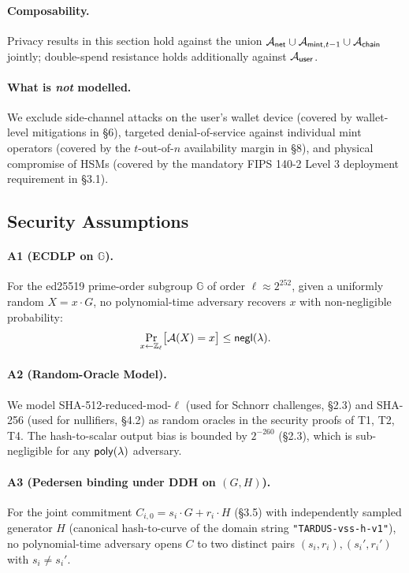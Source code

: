 \paragraph{Composability.} Privacy results in this section hold against the
union $\mathcal{A}_{\mathsf{net}} \cup \mathcal{A}_{\mathsf{mint},t-1} \cup
\mathcal{A}_{\mathsf{chain}}$ jointly; double-spend resistance holds additionally
against $\mathcal{A}_{\mathsf{user}}$.

\paragraph{What is \emph{not} modelled.} We exclude side-channel attacks on
the user's wallet device (covered by wallet-level mitigations in
\S6), targeted denial-of-service against individual mint
operators (covered by the $t$-out-of-$n$ availability margin in
\S8), and physical compromise of HSMs (covered by the
mandatory FIPS 140-2 Level 3 deployment requirement in \S3.1).

\subsection{Security Assumptions}
\label{sec:security-assumptions}

\paragraph{A1 (ECDLP on $\mathbb{G}$).}
\label{assn:ecdlp}
For the ed25519 prime-order subgroup $\mathbb{G}$ of order
$\ell \approx 2^{252}$, given a uniformly random $X = x \cdot G$, no
polynomial-time adversary recovers $x$ with non-negligible probability:
\[
  \Pr_{x \gets \mathbb{Z}_\ell}\bigl[\mathcal{A}(X) = x\bigr] \leq \mathsf{negl}(\lambda).
\]

\paragraph{A2 (Random-Oracle Model).}
\label{assn:rom}
We model SHA-512-reduced-mod-$\ell$ (used for Schnorr challenges,
\S2.3) and SHA-256 (used for nullifiers,
\S4.2) as random oracles in the security proofs of
T1, T2, T4. The hash-to-scalar output bias is bounded by $2^{-260}$
(\S2.3), which is sub-negligible for any
$\mathsf{poly}(\lambda)$ adversary.

\paragraph{A3 (Pedersen binding under DDH on $(G, H)$).}
\label{assn:pedersen}
For the joint commitment $C_{i,0} = s_i \cdot G + r_i \cdot H$
(\S3.5) with independently sampled generator $H$
(canonical hash-to-curve of the domain string \texttt{"TARDUS-vss-h-v1"}),
no polynomial-time adversary opens $C$ to two distinct pairs
$(s_i, r_i), (s_i', r_i')$ with $s_i \neq s_i'$.


